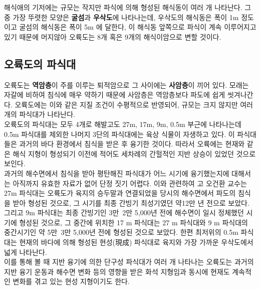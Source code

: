 \documentclass[12pt, a4paper, twoside]{book}
\begin{document}
			해식애의 기저에는 규모는 작지만 파식에 의해 형성된 해식동이 여러 개 나타난다. 
			그 중 가장 뚜렷한 모양은 \textbf{굴섬}과 \textbf{우삭도}에 나타나는데, 우삭도의 해식동은 폭이 1m  정도이고 굴섬의 해식동은 폭이 5m 에 달한다, 
			이 해식동 앞쪽으로 파식이 계속 이루어지고 있기 때문에 머지않아 오륙도는 8개 혹은 9개의 해식이암으로 변할 것이다. \\
			


	\subsection{오륙도의 파식대}
	

			오륙도는 \textbf{역암층}이 주를 이루는 퇴적암으로 그 사이에는 \textbf{사암층}이 끼어 있다. 
			모래는 자갈에 비하여 침식에 매우 약하기 때문에 사암층은 역암층보다 파도에 쉽게 씻겨나간다. 
			오륙도에는 이와 같은 지질 조건이 수평적으로 반영되어, 규모는 크지 않지만 여러 개의 파식대가 나타난다. \\
			 
			오륙도의 파식대는 모두 4개로 해발고도 27m, 17m, 9m, 0.5m 부근에 나타나는데 0.5m 파식대를 제외한 나머지 3단의 파식대에는 육상 식물이 자생하고 있다. 
			이 파식대들은 과거의 바다 환경에서 침식을 받은 후 융기한 것이다. 따라서 오륙에는 현재와 같은 해식 지형이 형성되기 이전에 적어도 세차례의 간헐적인 지반 상승이 있었던 것으로 보인다. \\
			
			과거의 해수면에서 침식을 받아 평탄해진 파식대가 어느 시기에 융기했는지에 대해서는 아직까지 유효한 자료가 없어 단정 짓기 어렵다. 
			이와 관련하여 고 오건환 교수는 27m 파식대는 오륙도가 육지의 승두말과 연결되었을 당시의 해수면에서 파도의 침식을 받아 형성된 것으로, 그 시기를 최종 간빙기 최성기였던 약12만 년 전으로 보았다. 
			그리고 9m 파식대는 최종 간빙기인 3만~2만 5,000년 전에 해수면이 일시 정체했던 시기에 형성된 것으로, 그 중간에 위치한 17 m 파식대는 27 m 파식대와 9 m 파식대의 중간시기인 약 5만~3만 5,000년 전에 형성된 것으로 보았다. 
			한편 최저위의 0.5m 파식대는 현재의 바다에 의해 형성된 현성(現成) 파식대로 육지와 가장 가까운 우삭도에서 넓게 나타난다. \\
			
			이를 통해 볼 때 지반 융기에 의한 단구성 파식대가 여러 개 나타나는 오륙도는 과거의 지반 융기 운동과 해수면 변화 등의 영향을 받은 화석 지형임과 동시에 현재도 계속적인 변화를 겪고 있는 현성 지형이기도 한다.




\end{document}
